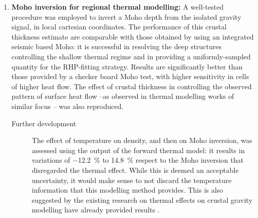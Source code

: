 \begin{enumerate}
    \item \textsf{\textbf{Moho inversion for regional thermal modelling:}}
    A well-tested procedure was employed to invert a Moho depth from the isolated gravity signal, in local cartesian coordinates.
    The performance of this crustal thickness estimate are comparable with those obtained by using an integrated seismic based Moho: it is successful in resolving the deep structures controlling the shallow thermal regime and in providing a uniformly-sampled quantity for the RHP-fitting strategy.
    Results are significantly better than those provided by a checker board Moho test, with higher sensitivity in cells of higher heat flow.
    The effect of crustal thickness in controlling the observed pattern of surface heat flow --as observed in thermal modelling works of similar focus \parencites()(to name a few){ScheckWenderoth2014}{Przybycin2015}{Limberger2018}-- was also reproduced.
    \begin{description}
        \item[\quad Further development] The effect of temperature on density, and then on Moho inversion, was assessed using the output of the forward thermal model: it results in variations of \SI{-12.2}{\percent} to \SI[retain-explicit-plus]{+14.8}{\percent} respect to the Moho inversion that disregarded the thermal effect. While this is deemed an acceptable uncertainty, it would make sense to not discard the temperature information that this modelling method provides. This is also suggested by the existing research on thermal effects on crustal gravity modelling have already provided  results \parencite[e.g.][]{Bagherbandi2017thermal}.
    \end{description}


\end{enumerate}
